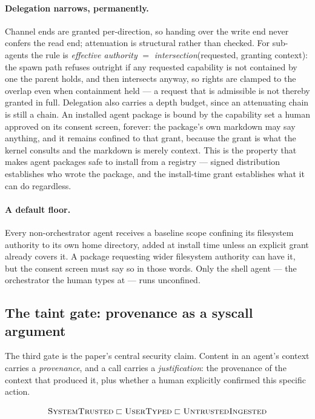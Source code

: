 \documentclass[11pt]{article}
\begin{document}
\paragraph{Delegation narrows, permanently.} Channel ends are granted
per-direction, so handing over the write end never confers the read end;
attenuation is structural rather than checked. For sub-agents the rule is
\emph{effective authority} $=$ \emph{intersection}(requested, granting
context): the spawn path refuses outright if any requested capability is not
contained by one the parent holds, and then intersects anyway, so rights are
clamped to the overlap even when containment held --- a request that is
admissible is not thereby granted in full. Delegation also carries a depth
budget, since an attenuating chain is still a chain. An installed agent package is bound by the
capability set a human approved on its consent screen, forever: the package's
own markdown may say anything, and it remains confined to that grant, because
the grant is what the kernel consults and the markdown is merely context. This
is the property that makes agent packages safe to install from a registry ---
signed distribution establishes who wrote the package, and the install-time
grant establishes what it can do regardless.

\paragraph{A default floor.} Every non-orchestrator agent receives a baseline
scope confining its filesystem authority to its own home directory, added at
install time unless an explicit grant already covers it. A package requesting
wider filesystem authority can have it, but the consent screen must say so in
those words. Only the shell agent --- the orchestrator the human types at ---
runs unconfined.

\subsection{The taint gate: provenance as a syscall argument}
\label{sec:taint}

The third gate is the paper's central security claim. Content in an agent's
context carries a \emph{provenance}, and a call carries a
\emph{justification}: the provenance of the context that produced it, plus
whether a human explicitly confirmed this specific action.

\[
\textsc{SystemTrusted} \sqsubset \textsc{UserTyped} \sqsubset \textsc{UntrustedIngested}
\]
\end{document}
